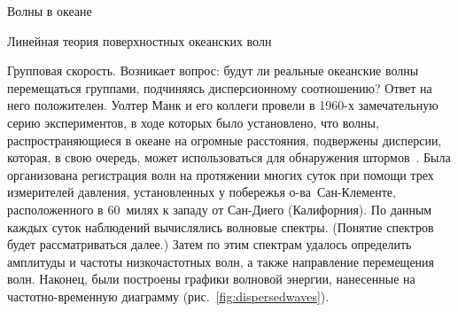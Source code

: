 \begin{chapter}{Волны в океане}
\begin{section}{Линейная теория поверхностных океанских волн}
\begin{paragraph}{Групповая скорость.}
Возникает вопрос: будут ли реальные океанские волны перемещаться группами,
подчиняясь дисперсионному соотношению? Ответ на него положителен. Уолтер Манк
и его коллеги провели в 1960-х замечательную серию экспериментов, в ходе
которых было установлено, что волны, распространяющиеся в океане на огромные
расстояния, подвержены дисперсии, которая, в свою очередь, может 
использоваться для обнаружения штормов~\cite{Munk:1963}. 
Была организована регистрация волн на протяжении многих суток при помощи 
трех измерителей давления, установленных у побережья о-ва~Сан-Клементе, 
расположенного в 60~милях
к западу от Сан-Диего (Калифорния). По данным каждых суток наблюдений
вычислялись волновые спектры. (Понятие спектров будет рассматриваться далее.)
Затем по этим спектрам удалось определить амплитуды и частоты
низкочастотных волн, а также направление перемещения волн.
Наконец, были построены графики волновой энергии, нанесенные на 
частотно-временную диаграмму (рис.~\ref{fig:dispersedwaves}).
%


\end{paragraph}
\end{section}
\end{chapter}
